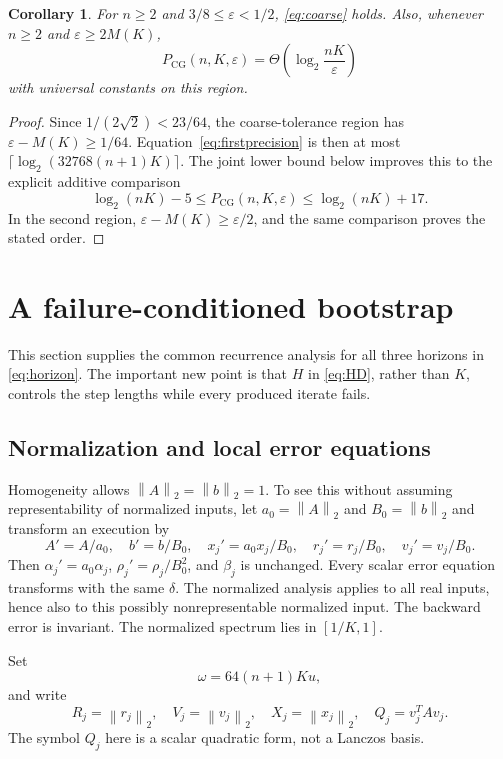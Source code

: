 \documentclass[11pt]{article}
\newtheorem{corollary}[theorem]{Corollary}
\theoremstyle{remark}\newtheorem{remark}[theorem]{Remark}
\newcommand{\norm}[1]{\left\lVert#1\right\rVert_2}
\newcommand{\PCG}{P_{\mathrm{CG}}}
\newcommand{\eps}{\varepsilon}
\begin{document}
\begin{corollary}\label{cor:first}
For $n\ge2$ and $3/8\le\eps<1/2$, \eqref{eq:coarse} holds.
Also, whenever $n\ge2$ and $\eps\ge2M(K)$,
\[
\PCG(n,K,\eps)=\Theta\!\left(\log_2\frac{nK}{\eps}\right)
\]
with universal constants on this region.
\end{corollary}
\begin{proof}
Since $1/(2\sqrt2)<23/64$, the coarse-tolerance region has
$\eps-M(K)\ge1/64$. Equation~\eqref{eq:firstprecision} is then at most
$\lceil\log_2(32768(n+1)K)\rceil$.
The joint lower bound below improves this to the explicit additive comparison
\[
\log_2(nK)-5\le\PCG(n,K,\eps)\le\log_2(nK)+17.
\]
In the second region, $\eps-M(K)\ge\eps/2$, and the same comparison
proves the stated order.
\end{proof}

\section{A failure-conditioned bootstrap}
\label{sec:bootstrap}

This section supplies the common recurrence analysis for all three
horizons in \eqref{eq:horizon}. The important new point is that $H$ in
\eqref{eq:HD}, rather than $K$, controls the step lengths while every
produced iterate fails.

\subsection{Normalization and local error equations}

Homogeneity allows $\norm A=\norm b=1$. To see this without assuming
representability of normalized inputs, let $a_0=\norm A$ and
$B_0=\norm b$ and transform an execution by
\[
A'=A/a_0,\quad b'=b/B_0,\quad x_j'=a_0x_j/B_0,\quad
r_j'=r_j/B_0,\quad v_j'=v_j/B_0.
\]
Then $\alpha_j'=a_0\alpha_j$, $\rho_j'=\rho_j/B_0^2$, and $\beta_j$
is unchanged. Every scalar error equation transforms with the same
$\delta$. The normalized analysis applies to all real inputs, hence also
to this possibly nonrepresentable normalized input. The backward error
is invariant. The normalized spectrum lies in $[1/K,1]$.

Set
\begin{equation}\label{eq:omega}
\omega=64(n+1)Ku,
\end{equation}
and write
\[
R_j=\norm{r_j},\quad V_j=\norm{v_j},\quad X_j=\norm{x_j},\quad
Q_j=v_j^TAv_j.
\]
The symbol $Q_j$ here is a scalar quadratic form, not a Lanczos basis.
\end{document}
